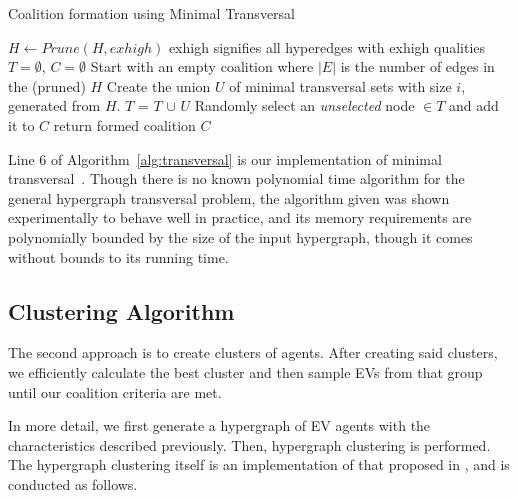 \begin{algorithm}
	\caption{Coalition formation using Minimal Transversal}\label{alg:transversal}
	\begin{algorithmic}[1]
		\State $H \gets Prune(H, exhigh)$ \Comment exhigh signifies all hyperedges with exhigh qualities
		\State $T= \emptyset$, $C = \emptyset$ \Comment Start with an empty coalition
		 \Comment where $|E|$ is the number of edges in the (pruned) $H$
		\State Create the union $U$ of minimal transversal sets with size $i$, generated from $H$.
		\State $T$ = $T$ $\cup$ $U$
		\State Randomly select an {\em unselected} node  $\in T $ and add it to $C$
		\EndWhile
		\State return formed coalition $C$
		\EndIf
		\EndFor
		\EndProcedure
	\end{algorithmic}
\end{algorithm}

Line 6 of Algorithm~\ref{alg:transversal} is our implementation of minimal transversal~\cite{eiter1995identifying}. Though there is no known polynomial time algorithm for the general hypergraph transversal problem, the algorithm given was shown experimentally to behave well in practice, and its memory requirements are polynomially bounded by the size of the input hypergraph, though it comes without bounds to its running time.

\subsection{Clustering Algorithm}\label{sec:Clustering}
The second approach is to create clusters of agents. After creating said clusters, we efficiently calculate the best cluster and then sample EVs from that group until our coalition criteria are met.

In more detail, we first generate a hypergraph of EV agents with the characteristics described previously. Then, hypergraph clustering is performed.
The hypergraph clustering itself is an implementation of that proposed in \cite{zhou2006learning}, and is conducted as follows. 	%

